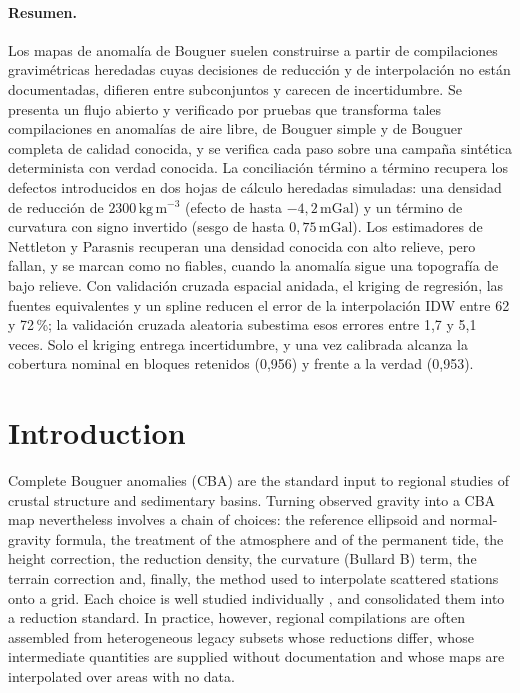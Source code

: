 \documentclass[11pt,a4paper]{article}
\newcommand{\mgal}{\ensuremath{\,\mathrm{mGal}}}
\newcommand{\kgm}{\ensuremath{\,\mathrm{kg\,m^{-3}}}}
\begin{document}
\paragraph{Resumen.} Los mapas de anomal\'ia de Bouguer suelen construirse a partir de compilaciones gravim\'etricas heredadas cuyas decisiones de reducci\'on y de interpolaci\'on no est\'an documentadas, difieren entre subconjuntos y carecen de incertidumbre. Se presenta un flujo abierto y verificado por pruebas que transforma tales compilaciones en anomal\'ias de aire libre, de Bouguer simple y de Bouguer completa de calidad conocida, y se verifica cada paso sobre una campa\~na sint\'etica determinista con verdad conocida. La conciliaci\'on t\'ermino a t\'ermino recupera los defectos introducidos en dos hojas de c\'alculo heredadas simuladas: una densidad de reducci\'on de $2300\kgm$ (efecto de hasta $-4{,}2\mgal$) y un t\'ermino de curvatura con signo invertido (sesgo de hasta $0{,}75\mgal$). Los estimadores de Nettleton y Parasnis recuperan una densidad conocida con alto relieve, pero fallan, y se marcan como no fiables, cuando la anomal\'ia sigue una topograf\'ia de bajo relieve. Con validaci\'on cruzada espacial anidada, el kriging de regresi\'on, las fuentes equivalentes y un spline reducen el error de la interpolaci\'on IDW entre 62 y 72\,\%; la validaci\'on cruzada aleatoria subestima esos errores entre 1,7 y 5,1 veces. Solo el kriging entrega incertidumbre, y una vez calibrada alcanza la cobertura nominal en bloques retenidos (0,956) y frente a la verdad (0,953).

\section{Introduction}

Complete Bouguer anomalies (CBA) are the standard input to regional studies of crustal structure and sedimentary basins. Turning observed gravity into a CBA map nevertheless involves a chain of choices: the reference ellipsoid and normal-gravity formula, the treatment of the atmosphere and of the permanent tide, the height correction, the reduction density, the curvature (Bullard B) term, the terrain correction and, finally, the method used to interpolate scattered stations onto a grid. Each choice is well studied individually \citep{LaFehr1991b,Hinze2003,Nowell1999,HackneyFeatherstone2003}, and \citet{Hinze2005} consolidated them into a reduction standard. In practice, however, regional compilations are often assembled from heterogeneous legacy subsets whose reductions differ, whose intermediate quantities are supplied without documentation and whose maps are interpolated over areas with no data.
\end{document}
